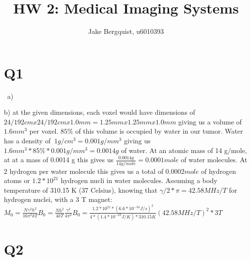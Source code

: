 \documentclass[12pt]{article}
\begin{document}
\title{HW 2: Medical Imaging Systems}
\author{Jake Bergquist, u6010393 }
\maketitle

\section{Q1}\
a)

b) at the given dimensions, each voxel would have dimensions of $24/192 cmx 24/192 cmx 1.0mm = 1.25 mm x 1.25 mm x 1.0 mm$ giving us a volume of $1.6 mm^3$ per voxel. $85\%$ of this volume is occupied by water in our tumor. Water has a density of $~1 g/cm^3 = 0.001 g/mm^3$ giving us $1.6 mm^3 * 85\% * 0.001g/mm^3 = 0.0014 g$ of water. At an atomic mass of 14 g/mole, at at a mass of 0.0014 g this gives us $\frac{0.0014 g}{14 g/mole} = 0.0001 mole$ of water molecules. At 2 hydrogen per water molecule this gives us a total of $0.0002 mole$ of hydrogen atoms or $1.2 * 10^{21} $ hydrogen nucli in water molecules. Assuming a body temperature of 310.15 K (37 Celsius), knowing that $\gamma/2*\pi = 42.58 MHz/T$ for hydrogen nuclei, with a 3 T magnet:\\ $M_0 = \frac{N\gamma^2h^2}{16\pi^2kT}B_0 =\frac{Nh^2}{4kT}\frac{\gamma^2}{4\pi^2}B_0 = \frac{1.2*10^{21}* (6.6*10^{-34} J/s)^2}{4*(1.4*10^{-23} J/K)*310.15 K}(42.58 MHz/T)^2*3T$


\section{Q2}
\end{document}
